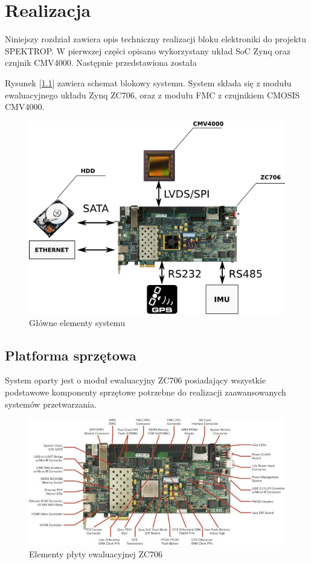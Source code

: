 \documentclass[a4paper,11pt,oneside]{book}  %
\begin{document}
\chapter{Realizacja}
Niniejszy rozdział zawiera opis techniczny realizacji bloku elektroniki do projektu SPEKTROP. W pierwszej części opisano wykorzystany układ SoC Zynq oraz czujnik CMV4000. Następnie przedstawiona została 

Rysunek [\ref{fig:OVER}] zawiera schemat blokowy systemu. System składa się z modułu ewaluacyjnego układu Zynq ZC706, oraz z modułu FMC z czujnikiem CMOSIS CMV4000.

\begin{figure}[!h]
	\centering
	\includegraphics[width=12cm]{OVER2.png}
	\caption{Główne elementy systemu}
	\label{fig:OVER}
\end{figure}

\section{Platforma sprzętowa}
System oparty jest o moduł ewaluacyjny ZC706 posiadający wszystkie podstawowe komponenty sprzętowe potrzebne do realizacji zaawansowanych systemów przetwarzania.

\begin{figure}[H]
	\centering
	\includegraphics[width=12cm]{zc706-base-board.jpg}
	\caption{Elementy płyty ewaluacyjnej ZC706}
	\label{fig:ZC706}
\end{figure}
\end{document}

